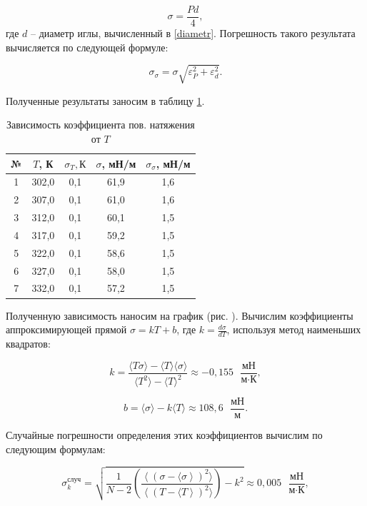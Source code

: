 \documentclass[a4paper,12pt]{article} %
\begin{document}
\begin{equation}\label{sigma}
\sigma = \frac{Pd}{4},
\end{equation}
где $ d $ -- диаметр иглы, вычисленный в \ref{diametr}. Погрешность такого результата вычисляется по следующей формуле:

\begin{equation}\label{otn_pogr}
\sigma_\sigma = \sigma\sqrt{\varepsilon^2_P + \varepsilon^2_d}.
\end{equation}

Полученные результаты заносим в таблицу \ref{tab:temp}.

\begin{table}[H]
	\centering
	\begin{tabular}{|c|c|c|c|c|}
		\hline
		№ & $ T $, К   & $ \sigma_T, К $   & $ \sigma $, мН/м & $ \sigma_\sigma $, мН/м \\ \hline
		1 & 302,0 & 0,1 & 61,9  & 1,6   \\ \hline
		2 & 307,0 & 0,1 & 61,0  & 1,6   \\ \hline
		3 & 312,0 & 0,1 & 60,1  & 1,5   \\ \hline
		4 & 317,0 & 0,1 & 59,2  & 1,5   \\ \hline
		5 & 322,0 & 0,1 & 58,6  & 1,5   \\ \hline
		6 & 327,0 & 0,1 & 58,0  & 1,5   \\ \hline
		7 & 332,0 & 0,1 & 57,2  & 1,5   \\ \hline
	\end{tabular}
	\caption{Зависимость коэффициента пов. натяжения от $T$}
	\label{tab:temp}
\end{table}

Полученную зависимость наносим на график (рис. ). Вычислим коэффициенты аппроксимирующей прямой $ \sigma = kT + b $, где $ \displaystyle k = \frac{d\sigma}{dT} $, используя метод наименьших квадратов:

\[ k = \frac{\langle T\sigma \rangle - \langle T \rangle \langle \sigma \rangle}{\langle T^2 \rangle - \langle T \rangle ^2} \approx -0,155\text{ } \frac{\text{мН}}{\text{м}\cdot\text{К}},\]

\[ b = \langle \sigma \rangle - k\langle T \rangle \approx 108,6\text{ } \frac{\text{мН}}{\text{м}}. \]

Случайные погрешности определения этих коэффициентов вычислим по следующим формулам:

\[ \sigma^\text{случ}_k = \sqrt{\frac{1}{N-2} \left(\frac{\left\langle\left(\sigma - \langle \sigma\right\rangle\right)^2 \rangle}{\left\langle\left(T - \langle T\right\rangle\right)^2 \rangle}\right)-k^2} \approx 0,005 \text{ } \frac{\text{мН}}{\text{м}\cdot\text{К}},\]
\end{document}
